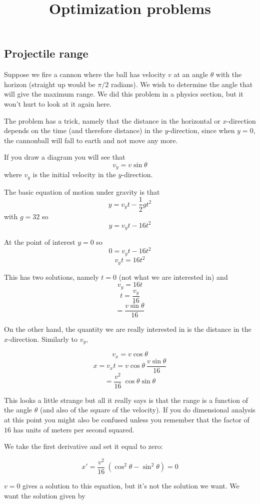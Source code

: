 \documentclass[11pt, oneside]{article}
\title{Optimization problems}
\date{}
\begin{document}
\maketitle
\Large

\subsection*{Projectile range}

Suppose we fire a cannon where the ball has velocity $v$ at an angle $\theta$ with the horizon (straight up would be $\pi/2$ radians).  We wish to determine the angle that will give the maximum range.  We did this problem in a physics section, but it won't hurt to look at it again here.

The problem has a trick, namely that the distance in the horizontal or $x$-direction depends on the time (and therefore distance) in the $y$-direction, since when $y=0$, the cannonball will fall to earth and not move any more.

If you draw a diagram you will see that 
\[ v_y = v \sin \theta \]
where $v_y$ is the initial velocity in the $y$-direction.

The basic equation of motion under gravity is that 
\[ y = v_y t - \frac{1}{2}gt^2 \]
with $g=32$ so
\[ y = v_y t - 16t^2 \]

At the point of interest $y=0$ so
\[ 0 = v_y t - 16t^2 \]
\[ v_y t = 16 t^2 \]

This has two solutions, namely $t=0$ (not what we are interested in) and
\[ v_y = 16 t \]
\[ t = \frac{v_y}{16} \]
\[ = \frac{v \sin \theta}{16} \]

On the other hand, the quantity we are really interested in is the distance in the $x$-direction.  Similarly to $v_y$, 

\[ v_x = v \cos \theta \]
\[ x = v_x t = v \cos \theta \ \frac{v \sin \theta}{16} \]
\[ = \frac{v^2}{16} \ \cos \theta \sin \theta \]

This looks a little strange but all it really says is that the range is a function of the angle $\theta$ (and also of the square of the velocity).  If you do dimensional analysis at this point you might also be confused unless you remember that the factor of $16$ has units of meters per second squared.

We take the first derivative and set it equal to zero:

\[ x' = \frac{v^2}{16} \ (\cos^2 \theta - \sin^2 \theta ) = 0 \]

$v = 0$ gives a solution to this equation, but it's not the solution we want.  We want the solution given by
\end{document}
